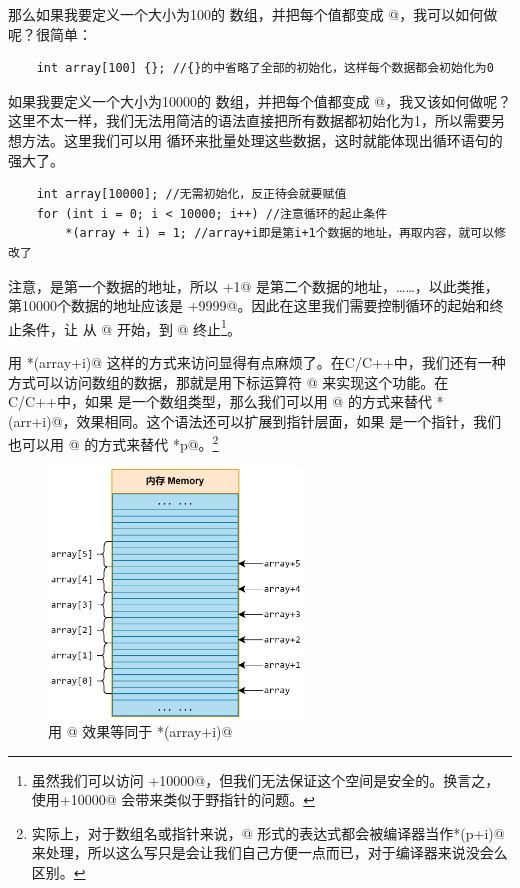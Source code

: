 那么如果我要定义一个大小为100的 \lstinline@int@ 数组，并把每个值都变成 @，我可以如何做呢？很简单：
\begin{lstlisting}
    int array[100] {}; //{}的中省略了全部的初始化，这样每个数据都会初始化为0
\end{lstlisting}\par
如果我要定义一个大小为10000的 \lstinline@int@ 数组，并把每个值都变成 @，我又该如何做呢？这里不太一样，我们无法用简洁的语法直接把所有数据都初始化为1，所以需要另想方法。这里我们可以用 \lstinline@for@ 循环来批量处理这些数据，这时就能体现出循环语句的强大了。
\begin{lstlisting}
    int array[10000]; //无需初始化，反正待会就要赋值
    for (int i = 0; i < 10000; i++) //注意循环的起止条件
        *(array + i) = 1; //array+i即是第i+1个数据的地址，再取内容，就可以修改了
\end{lstlisting}
注意，\lstinline@array@ 是第一个数据的地址，所以 \lstinline@array+1@ 是第二个数据的地址，……，以此类推，第10000个数据的地址应该是 \lstinline@array+9999@。因此在这里我们需要控制循环的起始和终止条件，让 \lstinline@i@ 从 @ 开始，到 @ 终止\footnote{虽然我们可以访问 \lstinline@array+10000@，但我们无法保证这个空间是安全的。换言之，使用\lstinline@array+10000@ 会带来类似于野指针的问题。}。\par
用 \lstinline@*(array+i)@ 这样的方式来访问显得有点麻烦了。在C/C++中，我们还有一种方式可以访问数组的数据，那就是用下标运算符 \lstinline@[]@ 来实现这个功能。在C/C++中，如果 \lstinline@arr@ 是一个数组类型，那么我们可以用 \lstinline@arr[i]@ 的方式来替代 \lstinline@*(arr+i)@，效果相同。这个语法还可以扩展到指针层面，如果 \lstinline@p@ 是一个指针，我们也可以用 \lstinline@p[0]@ 的方式来替代 \lstinline@*p@。\footnote{实际上，对于数组名或指针来说，\lstinline@p[i]@ 形式的表达式都会被编译器当作\lstinline@*(p+i)@ 来处理，所以这么写只是会让我们自己方便一点而已，对于编译器来说没会么区别。}\par
\begin{figure}[htbp]
    \centering
    \includegraphics[width=0.6\textwidth]{../images/generalized_parts/05_variables_one_by_one_in_array.drawio.png}
    \caption{用 \lstinline@array[i]@ 效果等同于 \lstinline@*(array+i)@}
\end{figure}
